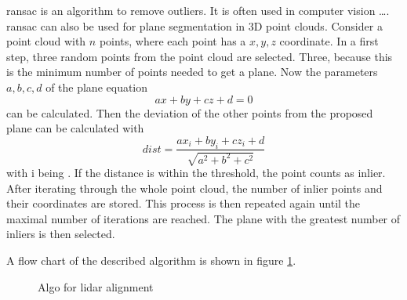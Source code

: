 \acrfull{ransac} \cite{Fischler1981} is an algorithm to remove outliers.
It is often used in computer vision \dots.
\acrshort{ransac} can also be used for plane segmentation in 3D point clouds.
Consider a point cloud with $n$ points, where each point has a $x, y, z$ coordinate.
In a first step, three random points from the point cloud are selected.
Three, because this is the minimum number of points needed to get a plane.
Now the parameters $a, b, c, d$ of the plane equation
\begin{equation}
    ax + by + cz + d = 0
\end{equation}
can be calculated.
Then the deviation of the other points from the proposed plane can be calculated with
\begin{equation}
    dist = \frac{ax_i + by_i + cz_i + d}{\sqrt{a^2 + b^2 + c^2}}
\end{equation}
with i being .
If the distance is within the threshold, the point counts as inlier.
After iterating through the whole point cloud, the number of inlier points and their coordinates are stored.
This process is then repeated again until the maximal number of iterations are reached.
The plane with the greatest number of inliers is then selected.

A flow chart of the described algorithm is shown in figure \ref{fig:flowchart_lidar_calibration}.

\begin{figure}[htb]
    \centering
    
    \caption{Algo for \acrshort{lidar} alignment}
    \label{fig:flowchart_lidar_calibration}
\end{figure}

